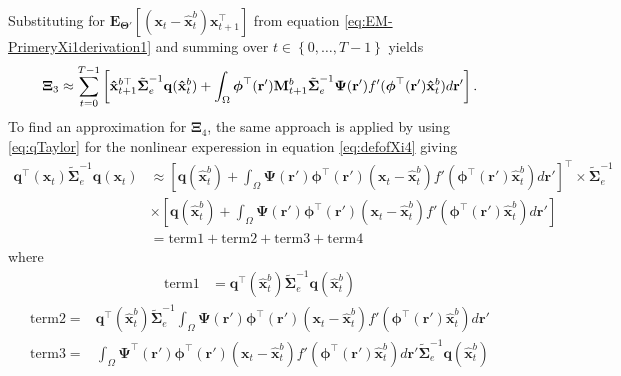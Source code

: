 \documentclass[]{article}
\begin{document}
Substituting for  $\mathbf E_{\boldsymbol\Theta'}\left[(\mathbf x_t - \mathbf  {\hat x}_t^b)\mathbf x_{t+1}^\top\right]$ from equation \eqref{eq:EM-PrimeryXi1derivation1} and summing over $t \in \left\lbrace 0, \dots, T-1\right\rbrace $ yields
\begin{equation}
\boldsymbol\Xi_{3}\approx\sum_{t=0}^{T-1}\left[ \mathbf{\hat x}_{t+1}^{b\top}\tilde{\boldsymbol\Sigma}_e^{-1}\mathbf q(\mathbf{\hat x}_t^b)+\int_\Omega\boldsymbol \phi^\top(\mathbf r') \mathbf M_{t+1}^b \tilde{\boldsymbol\Sigma}_e^{-1} \boldsymbol{\Psi}(\mathbf{r}') f'(\boldsymbol \phi^\top(\mathbf r')\mathbf {\hat x}_t^b) d\mathbf{r}'\right]. \label{eq:Xi3Ap} \\	
\end{equation}
To find an approximation for $\boldsymbol\Xi_4$, the same approach is applied by using \eqref{eq:qTaylor} for the nonlinear experession in equation \eqref{eq:defofXi4} giving
\begin{align}\label{eq:Xi4derivation1}
 \mathbf q^\top(\mathbf x_t)\tilde{\boldsymbol\Sigma}_e^{-1}\mathbf q(\mathbf x_t)&\approx \left[ \mathbf q(\mathbf {\hat x}_t^b)+\int_\Omega \boldsymbol{\Psi}(\mathbf{r}')\boldsymbol \phi^\top(\mathbf r') (\mathbf x_t - \mathbf  {\hat x}_t^b)f'(\boldsymbol \phi^\top(\mathbf r')\mathbf {\hat x}_t^b) d\mathbf{r}'\right]^\top  \times \tilde{\boldsymbol\Sigma}_e^{-1}\nonumber \\
&\times\left[ \mathbf q(\mathbf {\hat x}_t^b)+\int_\Omega \boldsymbol{\Psi}(\mathbf{r}')\boldsymbol \phi^\top(\mathbf r') (\mathbf x_t - \mathbf  {\hat x}_t^b)f'(\boldsymbol \phi^\top(\mathbf r')\mathbf {\hat x}_t^b) d\mathbf{r}'\right] \nonumber \\
&= \mathrm{term1} + \mathrm{term2} + \mathrm{term3} + \mathrm{term4}
\end{align}
where
\begin{align}
  \mathrm{term1}&=\mathbf q^\top(\mathbf {\hat x}_t^b)\tilde{\boldsymbol\Sigma}_e^{-1}\mathbf q(\mathbf {\hat x}_t^b)
\end{align}
\begin{align}
\mathrm{term2}=&\mathbf q^\top(\mathbf {\hat x}_t^b)\tilde{\boldsymbol\Sigma}_e^{-1}\int_\Omega \boldsymbol{\Psi}(\mathbf{r}')\boldsymbol \phi^\top(\mathbf r') (\mathbf x_t - \mathbf  {\hat x}_t^b)f'(\boldsymbol \phi^\top(\mathbf r')\mathbf {\hat x}_t^b) d\mathbf{r}'
 \end{align}
\begin{align}
\mathrm{term3}=&\int_\Omega \boldsymbol{\Psi}^\top(\mathbf{r}')\boldsymbol \phi^\top(\mathbf r') (\mathbf x_t - \mathbf  {\hat x}_t^b)f'(\boldsymbol \phi^\top(\mathbf r')\mathbf {\hat x}_t^b) d\mathbf{r}'\tilde{\boldsymbol\Sigma}_e^{-1}\mathbf q(\mathbf {\hat x}_t^b)
\end{align}
\end{document}
